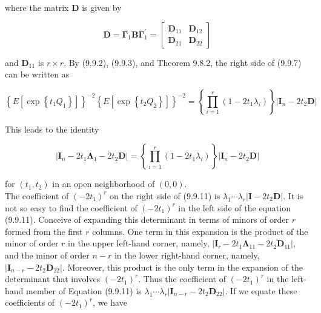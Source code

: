 where the matrix $\mathbf{D}$ is given by

\[
\mathbf{D}=\boldsymbol{\Gamma}_{1} \mathbf{B} \boldsymbol{\Gamma}_{1}^{\prime}=\left[\begin{array}{ll}
\mathbf{D}_{11} & \mathbf{D}_{12}  \tag{9.9.9}\\
\mathbf{D}_{21} & \mathbf{D}_{22}
\end{array}\right]
\]

and $\mathbf{D}_{11}$ is $r \times r$. By (9.9.2), (9.9.3), and Theorem 9.8.2, the right side of (9.9.7) can be written as


\begin{equation*}
\left\{E\left[\exp \left\{t_{1} Q_{1}\right\}\right]\right\}^{-2}\left\{E\left[\exp \left\{t_{2} Q_{2}\right\}\right]\right\}^{-2}=\left\{\prod_{i=1}^{r}\left(1-2 t_{1} \lambda_{i}\right)\right\}\left|\mathbf{I}_{n}-2 t_{2} \mathbf{D}\right| \tag{9.9.10}
\end{equation*}


This leads to the identity


\begin{equation*}
\left|\mathbf{I}_{n}-2 t_{1} \boldsymbol{\Lambda}_{1}-2 t_{2} \mathbf{D}\right|=\left\{\prod_{i=1}^{r}\left(1-2 t_{1} \lambda_{i}\right)\right\}\left|\mathbf{I}_{n}-2 t_{2} \mathbf{D}\right| \tag{9.9.11}
\end{equation*}


for $\left(t_{1}, t_{2}\right)$ in an open neighborhood of $(0,0)$.\\
The coefficient of $\left(-2 t_{1}\right)^{r}$ on the right side of (9.9.11) is $\lambda_{1} \cdots \lambda_{r}\left|\mathbf{I}-2 t_{2} \mathbf{D}\right|$. It is not so easy to find the coefficient of $\left(-2 t_{1}\right)^{r}$ in the left side of the equation (9.9.11). Conceive of expanding this determinant in terms of minors of order $r$ formed from the first $r$ columns. One term in this expansion is the product of the minor of order $r$ in the upper left-hand corner, namely, $\left|\mathbf{I}_{r}-2 t_{1} \mathbf{\Lambda}_{11}-2 t_{2} \mathbf{D}_{11}\right|$, and the minor of order $n-r$ in the lower right-hand corner, namely, $\left|\mathbf{I}_{n-r}-2 t_{2} \mathbf{D}_{22}\right|$. Moreover, this product is the only term in the expansion of the determinant that involves $\left(-2 t_{1}\right)^{r}$. Thus the coefficient of $\left(-2 t_{1}\right)^{r}$ in the left-hand member of Equation (9.9.11) is $\lambda_{1} \cdots \lambda_{r}\left|\mathbf{I}_{n-r}-2 t_{2} \mathbf{D}_{22}\right|$. If we equate these coefficients of $\left(-2 t_{1}\right)^{r}$, we have


